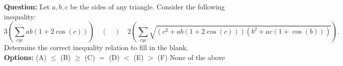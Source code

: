 \begin{examplebox}
\textbf{Question:} Let $a, b, c$ be the sides of any triangle. Consider the following inequality:
$$
3\left(\sum_{cyc} a b\left(1+2 \cos (c)\right)\right) \quad (\quad) \quad   2\left(\sum_{cyc} \sqrt{\left(c^2+a b(1+2 \cos (c))\right)\left(b^2+a c(1+\cos (b))\right)}\right).
$$
Determine the correct inequality relation to fill in the blank.\\

\textbf{Options:} (A) $\leq$ \quad(B) $\geq$ \quad (C) $=$  \quad (D) $<$ \quad  (E) $>$  \quad (F) None of the above

\end{examplebox}